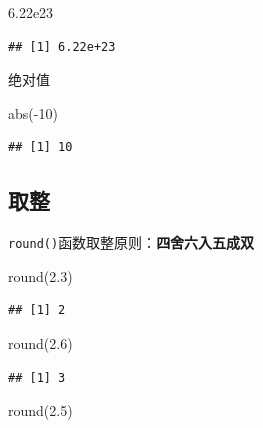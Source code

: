 \documentclass[
]{book}
\newenvironment{Shaded}{\begin{snugshade}}{\end{snugshade}}
\newcommand{\DecValTok}[1]{\textcolor[rgb]{0.00,0.00,0.81}{#1}}
\newcommand{\FloatTok}[1]{\textcolor[rgb]{0.00,0.00,0.81}{#1}}
\newcommand{\FunctionTok}[1]{\textcolor[rgb]{0.00,0.00,0.00}{#1}}
\newcommand{\NormalTok}[1]{#1}
\newcommand{\SpecialCharTok}[1]{\textcolor[rgb]{0.00,0.00,0.00}{#1}}
\begin{document}
\begin{Shaded}
\begin{Highlighting}[]
\FloatTok{6.22e23}
\end{Highlighting}
\end{Shaded}

\begin{verbatim}
## [1] 6.22e+23
\end{verbatim}

绝对值

\begin{Shaded}
\begin{Highlighting}[]
\FunctionTok{abs}\NormalTok{(}\SpecialCharTok{{-}}\DecValTok{10}\NormalTok{) }
\end{Highlighting}
\end{Shaded}

\begin{verbatim}
## [1] 10
\end{verbatim}

\hypertarget{ux53d6ux6574}{%
\subsection{取整}\label{ux53d6ux6574}}

\texttt{round()}函数取整原则：\textbf{四舍六入五成双}

\begin{Shaded}
\begin{Highlighting}[]
\FunctionTok{round}\NormalTok{(}\FloatTok{2.3}\NormalTok{)}
\end{Highlighting}
\end{Shaded}

\begin{verbatim}
## [1] 2
\end{verbatim}

\begin{Shaded}
\begin{Highlighting}[]
\FunctionTok{round}\NormalTok{(}\FloatTok{2.6}\NormalTok{)}
\end{Highlighting}
\end{Shaded}

\begin{verbatim}
## [1] 3
\end{verbatim}

\begin{Shaded}
\begin{Highlighting}[]
\FunctionTok{round}\NormalTok{(}\FloatTok{2.5}\NormalTok{)}
\end{Highlighting}
\end{Shaded}
\end{document}
